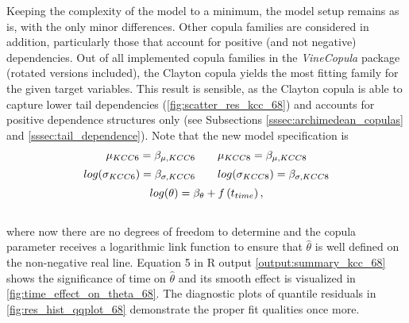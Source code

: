Keeping the complexity of the model to a minimum, the model setup remains as is, with the only minor differences. Other copula families are considered in addition, particularly those that account for positive (and not negative) dependencies. Out of all implemented copula families in the \textit{VineCopula} package (rotated versions included), the Clayton copula yields the most fitting family for the given target variables. This result is sensible, as the Clayton copula is able to capture lower tail dependencies (\autoref{fig:scatter_res_kcc_68}) and accounts for positive dependence structures only (see Subsections \ref{sssec:archimedean_copulas} and \ref{sssec:tail_dependence}). Note that the new model specification is \\

\begin{equation}
\begin{array}{c}
\mu_{KCC 6}=\beta_{\mu,KCC6} \qquad \mu_{KCC 8}=\beta_{\mu,KCC8}  \\  \noalign{\vskip5pt}

log(\sigma_{KCC 6})=\beta_{\sigma,KCC6} \qquad log(\sigma_{KCC 8})=\beta_{\sigma,KCC8} \\  \noalign{\vskip5pt}


log(\theta)=\beta_{\theta}+f\left(t_{time}\right),
\end{array}
\label{eq:gjrm_formula_68}
\end{equation}
\\

where now there are no degrees of freedom to determine and the copula parameter receives a logarithmic link function to ensure that $\hat{\theta}$ is well defined on the non-negative real line. Equation 5 in R output \ref{output:summary_kcc_68} shows the significance of time on $\hat{\theta}$ and its smooth effect is visualized in \autoref{fig:time_effect_on_theta_68}. The diagnostic plots of quantile residuals in \autoref{fig:res_hist_qqplot_68} demonstrate the proper fit qualities once more.
\\




